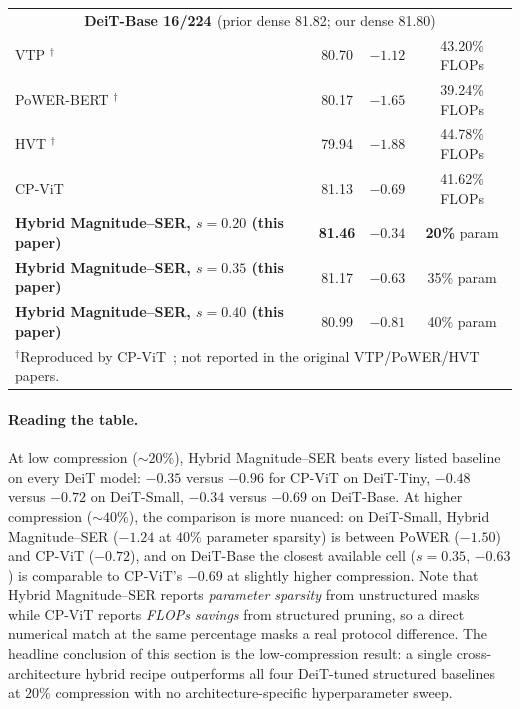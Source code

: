 \documentclass[11pt]{article}
\theoremstyle{plain}
\theoremstyle{definition}
\theoremstyle{remark}
\newcommand{\1}{\mathbf{1}}
\begin{document}
\begin{table}[ht]
\begin{tabular}{lccc}
\midrule
\multicolumn{4}{c}{\textbf{DeiT-Base 16/224 \cite{touvron2021training}} (prior dense 81.82; our dense 81.80)} \\
VTP \cite{zhu2021visual}$^\dagger$              & 80.70 & \(-1.12\) & 43.20\% FLOPs \\
PoWER-BERT \cite{goyal2020powerbert}$^\dagger$  & 80.17 & \(-1.65\) & 39.24\% FLOPs \\
HVT \cite{pan2021scalable}$^\dagger$            & 79.94 & \(-1.88\) & 44.78\% FLOPs \\
CP-ViT \cite{song2022cp}                        & 81.13 & \(-0.69\) & 41.62\% FLOPs \\
\textbf{Hybrid Magnitude--SER, \(s=0.20\) (this paper)} & \textbf{81.46} & \(\boldsymbol{-0.34}\) & \textbf{20\%} param \\
\textbf{Hybrid Magnitude--SER, \(s=0.35\) (this paper)} & 81.17 & \(-0.63\) & 35\% param \\
\textbf{Hybrid Magnitude--SER, \(s=0.40\) (this paper)} & 80.99 & \(-0.81\) & 40\% param \\
\bottomrule
\multicolumn{4}{l}{\footnotesize $^\dagger$Reproduced by CP-ViT~\cite{song2022cp}; not reported in the original VTP/PoWER/HVT papers.}
\end{tabular}
\end{table}

\paragraph{Reading the table.}
At low compression (\(\sim 20\%\)), Hybrid Magnitude--SER beats every listed baseline on every DeiT model: \(-0.35\) versus \(-0.96\) for CP-ViT on DeiT-Tiny, \(-0.48\) versus \(-0.72\) on DeiT-Small, \(-0.34\) versus \(-0.69\) on DeiT-Base.  At higher compression (\(\sim 40\%\)), the comparison is more nuanced: on DeiT-Small, Hybrid Magnitude--SER (\(-1.24\) at \(40\%\) parameter sparsity) is between PoWER (\(-1.50\)) and CP-ViT (\(-0.72\)), and on DeiT-Base the closest available cell (\(s=0.35\), \(-0.63\)) is comparable to CP-ViT's \(-0.69\) at slightly higher compression.  Note that Hybrid Magnitude--SER reports \emph{parameter sparsity} from unstructured masks while CP-ViT reports \emph{FLOPs savings} from structured pruning, so a direct numerical match at the same percentage masks a real protocol difference.  The headline conclusion of this section is the low-compression result: a single cross-architecture hybrid recipe outperforms all four DeiT-tuned structured baselines at \(20\%\) compression with no architecture-specific hyperparameter sweep.
\end{document}
